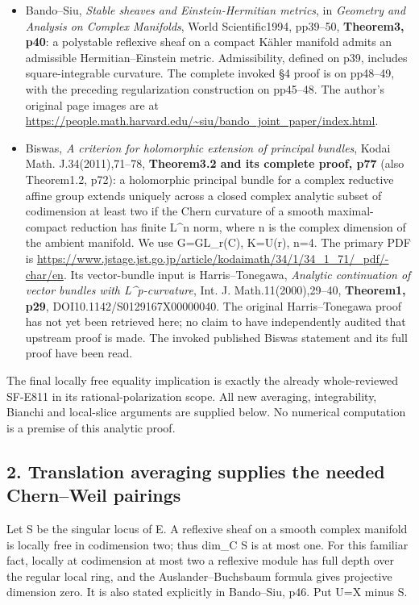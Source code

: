 \begin{itemize}
\item
  Bando--Siu, \emph{Stable sheaves and Einstein-Hermitian metrics}, in
  \emph{Geometry and Analysis on Complex Manifolds}, World
  Scientific1994, pp39--50, \textbf{Theorem3, p40}: a polystable
  reflexive sheaf on a compact Kähler manifold admits an admissible
  Hermitian--Einstein metric. Admissibility, defined on p39, includes
  square-integrable curvature. The complete invoked §4 proof is on
  pp48--49, with the preceding regularization construction on pp45--48.
  The author's original page images are at
  \url{https://people.math.harvard.edu/~siu/bando_joint_paper/index.html}.
\item
  Biswas, \emph{A criterion for holomorphic extension of principal
  bundles}, Kodai Math. J.34(2011),71--78, \textbf{Theorem3.2 and its
  complete proof, p77} (also Theorem1.2, p72): a holomorphic principal
  bundle for a complex reductive affine group extends uniquely across a
  closed complex analytic subset of codimension at least two if the
  Chern curvature of a smooth maximal-compact reduction has finite
  L\^{}n norm, where n is the complex dimension of the ambient manifold.
  We use G=GL\_r(C), K=U(r), n=4. The primary PDF is
  \url{https://www.jstage.jst.go.jp/article/kodaimath/34/1/34_1_71/_pdf/-char/en}.
  Its vector-bundle input is Harris--Tonegawa, \emph{Analytic
  continuation of vector bundles with L\^{}p-curvature}, Int. J.
  Math.11(2000),29--40, \textbf{Theorem1, p29},
  DOI10.1142/S0129167X00000040. The original Harris--Tonegawa proof has
  not yet been retrieved here; no claim to have independently audited
  that upstream proof is made. The invoked published Biswas statement
  and its full proof have been read.
\end{itemize}

The final locally free equality implication is exactly the already
whole-reviewed SF-E811 in its rational-polarization scope. All new
averaging, integrability, Bianchi and local-slice arguments are supplied
below. No numerical computation is a premise of this analytic proof.

\subsection{2. Translation averaging supplies the needed Chern--Weil
pairings}\label{SF-E834:translation-averaging-supplies-the-needed-chernweil-pairings}

Let S be the singular locus of E. A reflexive sheaf on a smooth complex
manifold is locally free in codimension two; thus dim\_C S is at most
one. For this familiar fact, locally at codimension at most two a
reflexive module has full depth over the regular local ring, and the
Auslander--Buchsbaum formula gives projective dimension zero. It is also
stated explicitly in Bando--Siu, p46. Put U=X minus S.

